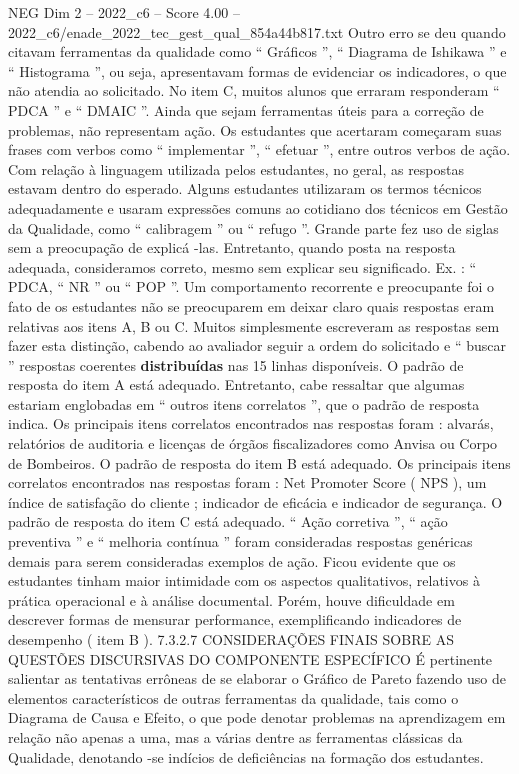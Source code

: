 \begin{textsample}{NEG Dim 2 – 2022\_c6 – Score 4.00 – 2022\_c6/enade\_2022\_tec\_gest\_qual\_854a44b817.txt}
Outro erro se deu quando citavam ferramentas da qualidade como “ Gráficos ”, “ Diagrama de Ishikawa ” e “ Histograma ”, ou seja, apresentavam formas de evidenciar os indicadores, o que não atendia ao solicitado.
No item C, muitos alunos que erraram responderam “ PDCA ” e “ DMAIC ”.
Ainda que sejam ferramentas úteis para a correção de problemas, não representam ação.
Os estudantes que acertaram começaram suas frases com verbos como “ implementar ”, “ efetuar ”, entre outros verbos de ação.
Com relação à linguagem utilizada pelos estudantes, no geral, as respostas estavam dentro do esperado.
Alguns estudantes utilizaram os termos técnicos adequadamente e usaram expressões comuns ao cotidiano dos técnicos em Gestão da Qualidade, como “ calibragem ” ou “ refugo ”.
Grande parte fez uso de siglas sem a preocupação de explicá -las.
Entretanto, quando posta na resposta adequada, consideramos correto, mesmo sem explicar seu significado.
Ex. : “ PDCA, “ NR ” ou “ POP ”.
Um comportamento recorrente e preocupante foi o fato de os estudantes não se preocuparem em deixar claro quais respostas eram relativas aos itens A, B ou C.
Muitos simplesmente escreveram as respostas sem fazer esta distinção, cabendo ao avaliador seguir a ordem do solicitado e “ buscar ” respostas coerentes \textbf{distribuídas} nas 15 linhas disponíveis.
O padrão de resposta do item A está adequado.
Entretanto, cabe ressaltar que algumas estariam englobadas em “ outros itens correlatos ”, que o padrão de resposta indica.
Os principais itens correlatos encontrados nas respostas foram : alvarás, relatórios de auditoria e licenças de órgãos fiscalizadores como Anvisa ou Corpo de Bombeiros.
O padrão de resposta do item B está adequado.
Os principais itens correlatos encontrados nas respostas foram : Net Promoter Score ( NPS ), um índice de satisfação do cliente ; indicador de eficácia e indicador de segurança.
O padrão de resposta do item C está adequado. “ Ação corretiva ”, “ ação preventiva ” e “ melhoria contínua ” foram consideradas respostas genéricas demais para serem consideradas exemplos de ação.
Ficou evidente que os estudantes tinham maior intimidade com os aspectos qualitativos, relativos à prática operacional e à análise documental.
Porém, houve dificuldade em descrever formas de mensurar performance, exemplificando indicadores de desempenho ( item B ). 7.3.2.7 CONSIDERAÇÕES FINAIS SOBRE AS QUESTÕES DISCURSIVAS DO COMPONENTE ESPECÍFICO É pertinente salientar as tentativas errôneas de se elaborar o Gráfico de Pareto fazendo uso de elementos característicos de outras ferramentas da qualidade, tais como o Diagrama de Causa e Efeito, o que pode denotar problemas na aprendizagem em relação não apenas a uma, mas a várias dentre as ferramentas clássicas da Qualidade, denotando -se indícios de deficiências na formação dos estudantes.

\end{textsample}
